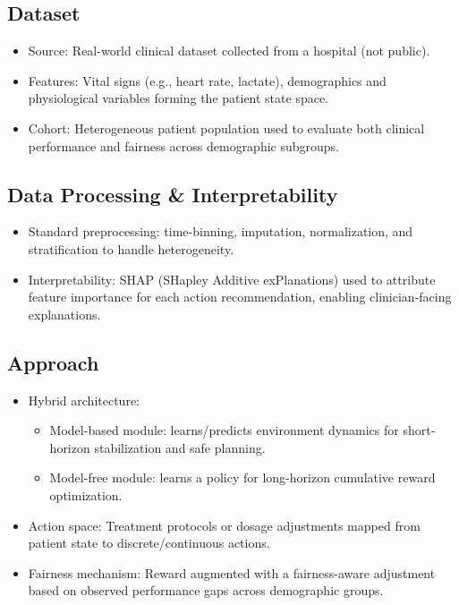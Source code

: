 \subsection*{Dataset}
\begin{itemize}
    \item Source: Real-world clinical dataset collected from a hospital (not public).
    \item Features: Vital signs (e.g., heart rate, lactate), demographics and physiological variables forming the patient state space.
    \item Cohort: Heterogeneous patient population used to evaluate both clinical performance and fairness across demographic subgroups.
\end{itemize}

\subsection*{Data Processing \& Interpretability}
\begin{itemize}
    \item Standard preprocessing: time-binning, imputation, normalization, and stratification to handle heterogeneity.
    \item Interpretability: SHAP (SHapley Additive exPlanations) used to attribute feature importance for each action recommendation, enabling clinician-facing explanations.
\end{itemize}

\subsection*{Approach}
\begin{itemize}
    \item Hybrid architecture:
    \begin{itemize}
        \item Model-based module: learns/predicts environment dynamics for short-horizon stabilization and safe planning.
        \item Model-free module: learns a policy for long-horizon cumulative reward optimization.
    \end{itemize}
    \item Action space: Treatment protocols or dosage adjustments mapped from patient state to discrete/continuous actions.
    \item Fairness mechanism: Reward augmented with a fairness-aware adjustment based on observed performance gaps across demographic groups.
\end{itemize}

